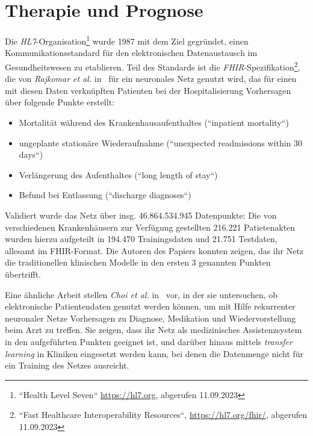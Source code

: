 \section{Therapie und Prognose}\label{sec:therapieprognose}

Die \textit{HL7}-Organisation\footnote{
    ``Health Level Seven`` \url{https://hl7.org}, abgerufen 11.09.2023
} wurde 1987 mit dem Ziel gegründet, einen Kommunikationsstandard für den elektronischen Datenaustausch im Gesundheitswesen zu etablieren. Teil des Standards ist die \textit{FHIR}-Spezifikation\footnote{
    ``Fast Healthcare Interoperability Resources``, \url{https://hl7.org/fhir/}, abgerufen 11.09.2023
}, die von \textit{Rajkomar et al.} in~\cite{ROC+18} für ein neuronales Netz genutzt wird, das für einen mit diesen Daten verknüpften Patienten bei der Hospitalisierung Vorhersagen über folgende Punkte erstellt:


\begin{itemize}
    \item Mortalität während des Krankenhausaufenthaltes (``inpatient mortality``)
    \item ungeplante stationäre Wiederaufnahme (``unexpected readmissions within 30 days``)
    \item Verlängerung des Aufenthaltes (``long length of stay``)
    \item Befund bei Entlassung (``discharge diagnoses``)
\end{itemize}


Validiert wurde das Netz über insg. 46.864.534.945 Datenpunkte: Die von verschiedenen Krankenhäusern zur Verfügung gestellten 216.221 Patietenakten wurden hierzu aufgeteilt in 194.470 Trainingsdaten und 21.751 Testdaten, allesamt im FHIR-Format. Die Autoren des Papiers konnten zeigen, das ihr Netz die traditionellen klinischen Modelle in den ersten 3 genannten Punkten übertrifft.

Eine ähnliche Arbeit stellen \textit{Choi et al.} in~\cite{CBS+16} vor, in der sie untersuchen, ob elektronische Patientendaten genutzt werden können, um mit Hilfe rekurrenter neuronaler Netze Vorhersagen zu Diagnose, Medikation und Wiedervorstellung beim Arzt zu treffen. Sie zeigen, dass ihr Netz als medizinisches Assistenzsystem in den aufgeführten Punkten geeignet ist, und darüber hinaus mittels \textit{transfer learning} in Kliniken eingesetzt werden kann, bei denen die Datenmenge nicht für ein Training des Netzes ausreicht.

